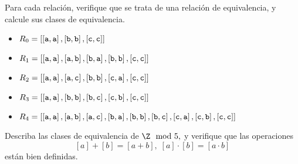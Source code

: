 \begin{problema}
	Para cada relación, verifique que se trata de una relación de equivalencia, y calcule sus clases de equivalencia.
\end{problema}

\begin{itemize}
	\item $\displaystyle R_{0}= \left[\left[\text{\texttt{a}}, \text{\texttt{a}}\right], \left[\text{\texttt{b}}, \text{\texttt{b}}\right], \left[\text{\texttt{c}}, \text{\texttt{c}}\right]\right] $
	\item $\displaystyle R_{1}= \left[\left[\text{\texttt{a}}, \text{\texttt{a}}\right], \left[\text{\texttt{a}}, \text{\texttt{b}}\right], \left[\text{\texttt{b}}, \text{\texttt{a}}\right], \left[\text{\texttt{b}}, \text{\texttt{b}}\right], \left[\text{\texttt{c}}, \text{\texttt{c}}\right]\right] $
	\item $\displaystyle R_{2}= \left[\left[\text{\texttt{a}}, \text{\texttt{a}}\right], \left[\text{\texttt{a}}, \text{\texttt{c}}\right], \left[\text{\texttt{b}}, \text{\texttt{b}}\right], \left[\text{\texttt{c}}, \text{\texttt{a}}\right], \left[\text{\texttt{c}}, \text{\texttt{c}}\right]\right] $
	\item $\displaystyle R_{3}= \left[\left[\text{\texttt{a}}, \text{\texttt{a}}\right], \left[\text{\texttt{b}}, \text{\texttt{b}}\right], \left[\text{\texttt{b}}, \text{\texttt{c}}\right], \left[\text{\texttt{c}}, \text{\texttt{b}}\right], \left[\text{\texttt{c}}, \text{\texttt{c}}\right]\right] $
	\item $\displaystyle R_{4}= \left[\left[\text{\texttt{a}}, \text{\texttt{a}}\right], \left[\text{\texttt{a}}, \text{\texttt{b}}\right], \left[\text{\texttt{a}}, \text{\texttt{c}}\right], \left[\text{\texttt{b}}, \text{\texttt{a}}\right], \left[\text{\texttt{b}}, \text{\texttt{b}}\right], \left[\text{\texttt{b}}, \text{\texttt{c}}\right], \left[\text{\texttt{c}}, \text{\texttt{a}}\right], \left[\text{\texttt{c}}, \text{\texttt{b}}\right], \left[\text{\texttt{c}}, \text{\texttt{c}}\right]\right] $
	
\end{itemize}





\begin{problema}
	\label{lip:exmp:2.13.b}
	Describa las clases de equivalencia de $\Z \mod 5,$ y verifique que las operaciones
	$$
	[a]+[b]=[a+b], \; [a]\cdot[b]=[a \cdot b]
	$$ están bien definidas.   
\end{problema}





